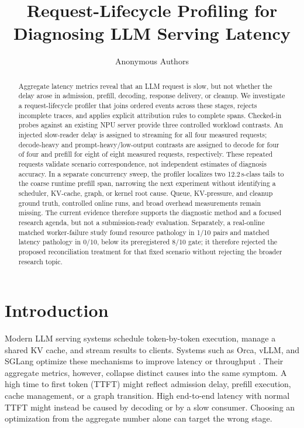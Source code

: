 \documentclass[sigconf,screen,nonacm]{acmart}
\title{Request-Lifecycle Profiling for Diagnosing LLM Serving Latency}
\author{Anonymous Authors}
\affiliation{\institution{Anonymous Institution}\country{}}
\begin{document}
\begin{abstract}
Aggregate latency metrics reveal that an LLM request is slow, but not whether
the delay arose in admission, prefill, decoding, response delivery, or cleanup.
We investigate a request-lifecycle profiler that joins ordered events across
these stages, rejects incomplete traces, and applies explicit attribution rules
to complete spans. Checked-in probes against an existing NPU server provide
three controlled workload contrasts. An injected slow-reader delay is assigned
to streaming for all four measured requests; decode-heavy and
prompt-heavy/low-output contrasts are assigned to decode for four of four and
prefill for eight of eight measured requests, respectively. These repeated
requests validate scenario correspondence, not independent estimates of
diagnosis accuracy. In a separate concurrency sweep, the profiler localizes two
12.2\,s-class tails to the coarse runtime prefill span, narrowing the next
experiment without identifying a scheduler, KV-cache, graph, or kernel root
cause. Queue, KV-pressure, and cleanup ground truth, controlled online runs,
and broad overhead measurements remain missing. The current evidence therefore
supports the diagnostic method and a focused research agenda, but not a
submission-ready evaluation.
Separately, a real-online matched worker-failure study found resource pathology
in 1/10 pairs and matched latency pathology in 0/10, below its preregistered
8/10 gate; it therefore rejected the proposed reconciliation treatment for
that fixed scenario without rejecting the broader research topic.
\end{abstract}


\maketitle

\section{Introduction}

Modern LLM serving systems schedule token-by-token execution, manage a shared
KV cache, and stream results to clients. Systems such as Orca, vLLM, and SGLang
optimize these mechanisms to improve latency or throughput
\cite{orca2022,vllm2023,sglang2024}. Their aggregate metrics, however, collapse
distinct causes into the same symptom. A high time to first token (TTFT) might
reflect admission delay, prefill execution, cache management, or a graph
transition. High end-to-end latency with normal TTFT might instead be caused by
decoding or by a slow consumer. Choosing an optimization from the aggregate
number alone can target the wrong stage.
\end{document}
